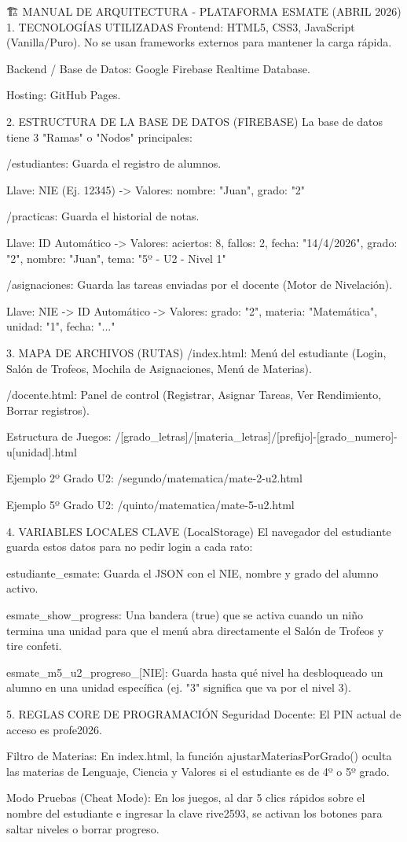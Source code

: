 🏗️ MANUAL DE ARQUITECTURA - PLATAFORMA ESMATE (ABRIL 2026)
1. TECNOLOGÍAS UTILIZADAS
Frontend: HTML5, CSS3, JavaScript (Vanilla/Puro). No se usan frameworks externos para mantener la carga rápida.

Backend / Base de Datos: Google Firebase Realtime Database.

Hosting: GitHub Pages.

2. ESTRUCTURA DE LA BASE DE DATOS (FIREBASE)
La base de datos tiene 3 "Ramas" o "Nodos" principales:

/estudiantes: Guarda el registro de alumnos.

Llave: NIE (Ej. 12345) -> Valores: { nombre: "Juan", grado: "2" }

/practicas: Guarda el historial de notas.

Llave: ID Automático -> Valores: { aciertos: 8, fallos: 2, fecha: "14/4/2026", grado: "2", nombre: "Juan", tema: "5º - U2 - Nivel 1" }

/asignaciones: Guarda las tareas enviadas por el docente (Motor de Nivelación).

Llave: NIE -> ID Automático -> Valores: { grado: "2", materia: "Matemática", unidad: "1", fecha: "..." }

3. MAPA DE ARCHIVOS (RUTAS)
/index.html: Menú del estudiante (Login, Salón de Trofeos, Mochila de Asignaciones, Menú de Materias).

/docente.html: Panel de control (Registrar, Asignar Tareas, Ver Rendimiento, Borrar registros).

Estructura de Juegos: /[grado_letras]/[materia_letras]/[prefijo]-[grado_numero]-u[unidad].html

Ejemplo 2º Grado U2: /segundo/matematica/mate-2-u2.html

Ejemplo 5º Grado U2: /quinto/matematica/mate-5-u2.html

4. VARIABLES LOCALES CLAVE (LocalStorage)
El navegador del estudiante guarda estos datos para no pedir login a cada rato:

estudiante_esmate: Guarda el JSON con el NIE, nombre y grado del alumno activo.

esmate_show_progress: Una bandera (true) que se activa cuando un niño termina una unidad para que el menú abra directamente el Salón de Trofeos y tire confeti.

esmate_m5_u2_progreso_[NIE]: Guarda hasta qué nivel ha desbloqueado un alumno en una unidad específica (ej. "3" significa que va por el nivel 3).

5. REGLAS CORE DE PROGRAMACIÓN
Seguridad Docente: El PIN actual de acceso es profe2026.

Filtro de Materias: En index.html, la función ajustarMateriasPorGrado() oculta las materias de Lenguaje, Ciencia y Valores si el estudiante es de 4º o 5º grado.

Modo Pruebas (Cheat Mode): En los juegos, al dar 5 clics rápidos sobre el nombre del estudiante e ingresar la clave rive2593, se activan los botones para saltar niveles o borrar progreso.
